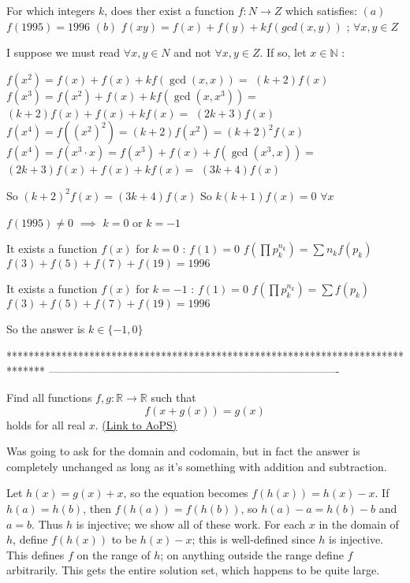 \begin{solution}
	\begin{tcolorbox}For which integers $ k$, does ther exist a function $ f: N \to Z$ which satisfies:
$ (a)$ $ f(1995) = 1996$
$ (b)$ $ f(xy) = f(x) + f(y) + kf(gcd(x,y))$ ; $ \forall x,y \in Z$\end{tcolorbox}

I suppose we must read $ \forall x,y \in N$ and not $ \forall x,y \in Z$. If so, let $ x\in\mathbb N$ :

$ f(x^2)=f(x)+f(x)+kf(\gcd(x,x))=$ $ (k+2)f(x)$
$ f(x^3)=f(x^2)+f(x)+kf(\gcd(x,x^3))=$ $ (k+2)f(x)+f(x)+kf(x)=$ $ (2k+3)f(x)$
$ f(x^4)=f((x^2)^2)=(k+2)f(x^2)=(k+2)^2f(x)$
$ f(x^4)=f(x^3\cdot x)=f(x^3)+f(x)+f(\gcd(x^3,x))=$ $ (2k+3)f(x)+f(x)+kf(x)=$ $ (3k+4)f(x)$

So $ (k+2)^2f(x)=(3k+4)f(x)$
So $ k(k+1)f(x)=0$ $ \forall x$

$ f(1995)\neq 0$ $ \implies$ $ k=0$ or $ k=-1$

It exists a function $ f(x)$ for $ k=0$ :
$ f(1)=0$
$ f(\prod p_k^{n_k})=\sum n_kf(p_k)$
$ f(3)+f(5)+f(7)+f(19)=1996$

It exists a function $ f(x)$ for $ k=-1$ :
$ f(1)=0$
$ f(\prod p_k^{n_k})=\sum f(p_k)$
$ f(3)+f(5)+f(7)+f(19)=1996$

So the answer is $ k\in\{-1,0\}$
\end{solution}
*******************************************************************************
-------------------------------------------------------------------------------

\begin{problem}
	Find all functions $f, g: \mathbb R \to \mathbb R$ such that
\[f(x+g(x))=g(x)\]
holds for all real $x$.
	\flushright \href{https://artofproblemsolving.com/community/c6h277490}{(Link to AoPS)}
\end{problem}



\begin{solution}
	Was going to ask for the domain and codomain, but in fact the answer is completely unchanged as long as it's something with addition and subtraction.

Let $ h(x) = g(x) + x$, so the equation becomes $ f(h(x)) = h(x) - x$. If $ h(a) = h(b)$, then $ f(h(a)) = f(h(b))$, so $ h(a) - a = h(b) - b$ and $ a = b$. Thus $ h$ is injective; we show all of these work. For each $ x$ in the domain of $ h$, define $ f(h(x))$ to be $ h(x) - x$; this is well-defined since $ h$ is injective. This defines $ f$ on the range of $ h$; on anything outside the range define $ f$ arbitrarily. This gets the entire solution set, which happens to be quite large.
\end{solution}



